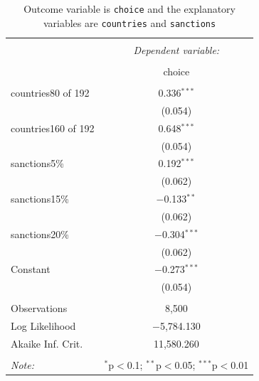 \documentclass{article} %
\begin{document}
 
\newpage
\begin{table}[h] \centering   \caption{Outcome variable is \texttt{choice} and the explanatory variables are \texttt{countries} and \texttt{sanctions}}   \label{} \begin{tabular}{@{\extracolsep{5pt}}lc} 
\\[-1.8ex]\hline \hline \\[-1.8ex]  & \multicolumn{1}{c}{\textit{Dependent variable:}} \\ \cline{2-2} \\[-1.8ex] & choice \\ \hline \\[-1.8ex]  countries80 of 192 & 0.336$^{***}$ \\   & (0.054) \\  
countries160 of 192 & 0.648$^{***}$ \\   & (0.054) \\   
sanctions5\% & 0.192$^{***}$ \\   & (0.062) \\   
sanctions15\% & $-$0.133$^{**}$ \\   & (0.062) \\   
sanctions20\% & $-$0.304$^{***}$ \\   & (0.062) \\   
Constant & $-$0.273$^{***}$ \\   & (0.054) \\  
\hline \\[-1.8ex] Observations & 8,500 \\ Log Likelihood & $-$5,784.130 \\ Akaike Inf. Crit. & 11,580.260 \\ \hline \hline \\[-1.8ex] \textit{Note:}  & \multicolumn{1}{r}{$^{*}$p$<$0.1; $^{**}$p$<$0.05; $^{***}$p$<$0.01} \\ 
\end{tabular} 
\end{table}  
\end{document}
